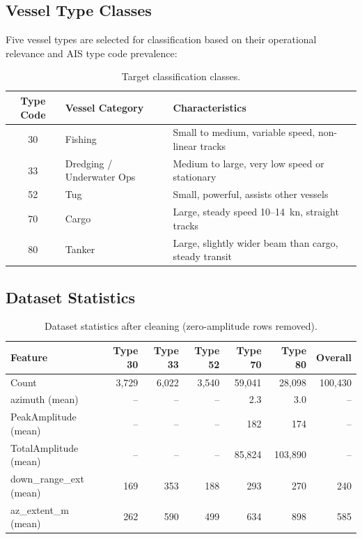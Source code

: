 \documentclass[12pt, a4paper]{article}
\begin{document}
\subsection{Vessel Type Classes}

Five vessel types are selected for classification based on their operational
relevance and AIS type code prevalence:

\begin{table}[H]
\centering
\caption{Target classification classes.}
\label{tab:classes}
\begin{tabular}{cll}
\toprule
\textbf{Type Code} & \textbf{Vessel Category} & \textbf{Characteristics} \\
\midrule
30 & Fishing           & Small to medium, variable speed, non-linear tracks \\
33 & Dredging / Underwater Ops & Medium to large, very low speed or stationary \\
52 & Tug               & Small, powerful, assists other vessels \\
70 & Cargo             & Large, steady speed 10--14~kn, straight tracks \\
80 & Tanker            & Large, slightly wider beam than cargo, steady transit \\
\bottomrule
\end{tabular}
\end{table}

\subsection{Dataset Statistics}

\begin{table}[H]
\centering
\caption{Dataset statistics after cleaning (zero-amplitude rows removed).}
\label{tab:dataset_stats}
\begin{tabular}{lrrrrrr}
\toprule
\textbf{Feature} & \textbf{Type 30} & \textbf{Type 33} & \textbf{Type 52}
                 & \textbf{Type 70} & \textbf{Type 80} & \textbf{Overall} \\
\midrule
Count           & 3{,}729  & 6{,}022  & 3{,}540  & 59{,}041  & 28{,}098  & 100{,}430 \\
\midrule
azimuth (mean)          & --   & --  & --  & 2.3 & 3.0 & -- \\
PeakAmplitude (mean)    & --   & --  & --  & 182 & 174 & -- \\
TotalAmplitude (mean)   & --   & --  & -- & 85{,}824 & 103{,}890 & -- \\
down\_range\_ext (mean) & 169  & 353 & 188 & 293 & 270 & 240 \\
az\_extent\_m (mean)    & 262  & 590 & 499 & 634 & 898 & 585 \\
\bottomrule
\end{tabular}
\end{table}
\end{document}
